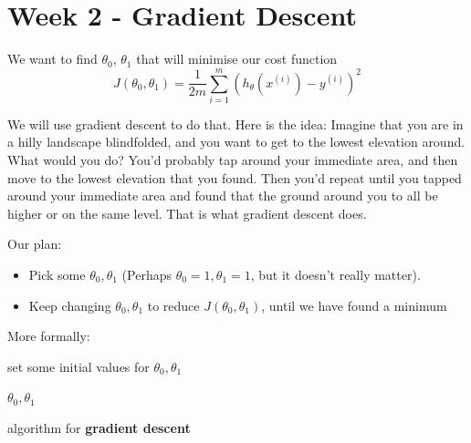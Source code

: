 \documentclass[11pt]{article}
\begin{document}
\section{Week 2 - Gradient Descent}

    We want to find $\theta_0$, $\theta_1$ that will minimise our cost function \[J(\theta_0, \theta_1) = \frac{1}{2m} \sum^m_{i=1}(h_\theta(x^{(i)}) - y^{(i)})^2\]

    We will use gradient descent to do that. Here is the idea: Imagine that you are in a hilly landscape blindfolded, and you want to get to the lowest elevation around. What would you do? You'd probably tap around your immediate area, and then move to the lowest elevation that you found. Then you'd repeat until you tapped around your immediate area and found that the ground around you to all be higher or on the same level. That is what gradient descent does.

    Our plan:
    \begin{itemize}
        \item Pick some $\theta_0, \theta_1$ (Perhaps $\theta_0=1, \theta_1=1$, but it doesn't really matter).
        \item Keep changing  $\theta_0, \theta_1$ to reduce $J(\theta_0, \theta_1)$, until we have found a minimum
    \end{itemize}

    More formally:
    
\begin{algorithm}
    \SetAlgoLined
     set some initial values for $\theta_0, \theta_1$ \\
    

    \Return $\theta_0, \theta_1$

    \caption{algorithm for \textbf{gradient descent}}
\end{algorithm} 
\end{document}
